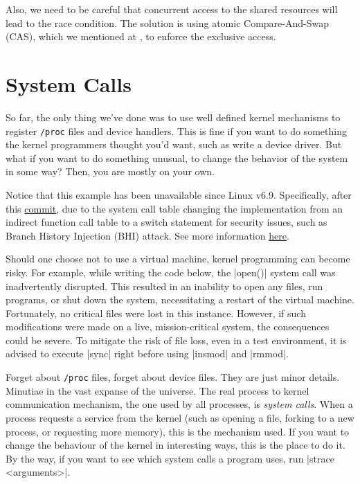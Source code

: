 \documentclass[10pt, oneside]{book}
\begin{document}
Also, we need to be careful that concurrent access to the shared resources will lead to the race condition.
The solution is using atomic Compare-And-Swap (CAS), which we mentioned at , to enforce the exclusive access.




\section{System Calls}
\label{sec:syscall}
So far, the only thing we've done was to use well defined kernel mechanisms to register \verb|/proc| files and device handlers.
This is fine if you want to do something the kernel programmers thought you'd want, such as write a device driver.
But what if you want to do something unusual, to change the behavior of the system in some way?
Then, you are mostly on your own.

Notice that this example has been unavailable since Linux v6.9.
Specifically, after this \href{https://github.com/torvalds/linux/commit/1e3ad78334a69b36e107232e337f9d693dcc9df2#diff-4a16bf89a09b4f49669a30d54540f0b936ea0224dc6ee9edfa7700deb16c3e11R52}{commit}, due to the system call table changing the implementation from an indirect function call table to a switch statement for security issues, such as Branch History Injection (BHI) attack.
See more information \href{https://bugs.launchpad.net/ubuntu/+source/linux/+bug/2060909}{here}.

Should one choose not to use a virtual machine, kernel programming can become risky.
For example, while writing the code below, the \cpp|open()| system call was inadvertently disrupted.
This resulted in an inability to open any files, run programs, or shut down the system, necessitating a restart of the virtual machine.
Fortunately, no critical files were lost in this instance.
However, if such modifications were made on a live, mission-critical system, the consequences could be severe.
To mitigate the risk of file loss, even in a test environment, it is advised to execute \sh|sync| right before using \sh|insmod| and \sh|rmmod|.

Forget about \verb|/proc| files, forget about device files.
They are just minor details.
Minutiae in the vast expanse of the universe.
The real process to kernel communication mechanism, the one used by all processes, is \emph{system calls}.
When a process requests a service from the kernel (such as opening a file, forking to a new process, or requesting more memory), this is the mechanism used.
If you want to change the behaviour of the kernel in interesting ways, this is the place to do it.
By the way, if you want to see which system calls a program uses, run \sh|strace <arguments>|.
\end{document}
